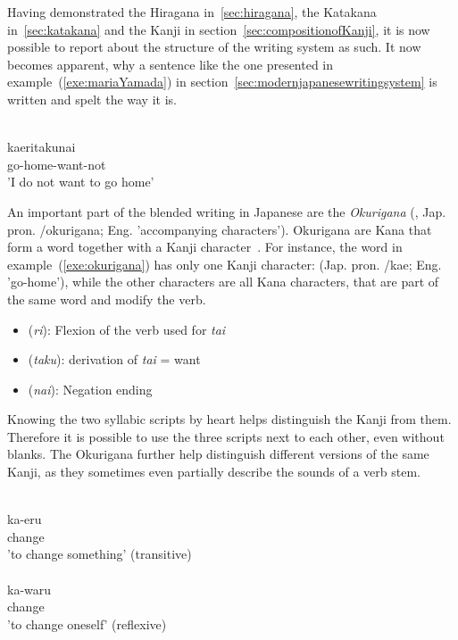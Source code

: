 Having demonstrated the Hiragana in~\ref{sec:hiragana}, the Katakana 
in~\ref{sec:katakana} and the Kanji in section~\ref{sec:compositionofKanji}, 
it is now possible to report about the structure of the writing system as such.
It now becomes apparent, why a sentence like the one presented in 
example~(\ref{exe:mariaYamada}) in section~\ref{sec:modernjapanesewritingsystem} 
is written and spelt the way it is.
\begin{exe}
\ex\label{exe:okurigana}
\gll 
  \\
 kaeritakunai \\
 go-home-want-not \\
\trans 'I do not want to go home' \\
\end{exe}
An important part of the blended writing in Japanese are the 
\emph{Okurigana} (, Jap. pron. /okurigana; 
Eng. 'accompanying characters'). Okurigana are Kana that form 
a word together with a Kanji character~.
For instance, the word in example~(\ref{exe:okurigana}) has only one Kanji 
character:  (Jap. pron. /kae; Eng. 'go-home'), while the other characters are all Kana characters, that are part of the same word and modify
the verb.
\begin{itemize}
  \item {} (\emph{ri}): Flexion of the verb used for \emph{tai}
  \item {} (\emph{taku}): derivation of \emph{tai} = want
  \item {} (\emph{nai}): Negation ending
\end{itemize}
Knowing the two syllabic scripts by heart helps distinguish the Kanji from them.
Therefore it is possible to use the three scripts next to each other, even 
without blanks. The Okurigana further help distinguish different versions of 
the same Kanji, as they sometimes even partially describe the sounds of a 
verb stem.
\begin{exe}
\ex\label{exe:stemspelling}
\begin{xlist}
\ex\label{exe:stemspellingkaeru}
\gll 
  \\
 ka-eru \\
 change \\
\trans 'to change something' (transitive) \\

\ex\label{exe:stemspellingkawaru}
\gll 
  \\
 ka-waru \\
 change \\
\trans 'to change oneself' (reflexive) \\
\end{xlist}
\end{exe}
